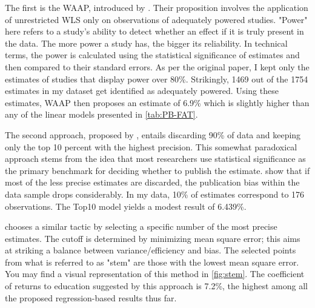 The first is the \ac{WAAP}, introduced by \cite{Ioannidis2017Waap}. Their proposition involves the application of unrestricted \ac{WLS} only on observations of adequately powered studies. "Power" here refers to a study's ability to detect whether an effect if it is truly present in the data. The more power a study has, the bigger its reliability. In technical terms, the power is calculated using the statistical significance of estimates and then compared to their standard errors. As per the original paper, I kept only the estimates of studies that display power over 80\%. Strikingly, 1469 out of the 1754 estimates in my dataset get identified as adequately powered. Using these estimates, \ac{WAAP} then proposes an estimate of 6.9\% which is slightly higher than any of the linear models presented in \autoref{tab:PB-FAT}.

The second approach, proposed by \cite{Stanley2010Top}, entails discarding 90\% of data and keeping only the top 10 percent with the highest precision. This somewhat paradoxical approach stems from the idea that most researchers use statistical significance as the primary benchmark for deciding whether to publish the estimate. \cite{Stanley2010Top} show that if most of the less precise estimates are discarded, the publication bias within the data sample drops considerably. In my data, 10\% of estimates correspond to 176 observations. The Top10 model yields a modest result of 6.439\%.

\cite{Furukawa2019Stem} chooses a similar tactic by selecting a specific number of the most precise estimates. The cutoff is determined by minimizing mean square error; this aims at striking a balance between variance/efficiency and bias. The selected points from what is referred to as "stem" are those with the lowest mean square error. You may find a visual representation of this method in \autoref{fig:stem}. The coefficient of returns to education suggested by this approach is 7.2\%, the highest among all the proposed regression-based results thus far.

